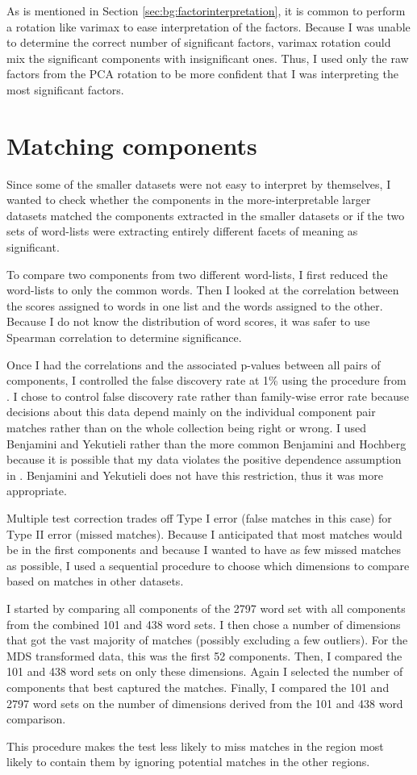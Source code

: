 As is mentioned in Section \ref{sec:bg:factorinterpretation}, it is common to
perform a rotation like varimax to ease interpretation of the factors. Because
I was unable to determine the correct number of significant factors, varimax
rotation could mix the significant components with insignificant ones. Thus, I
used only the raw factors from the PCA rotation to be more confident that I was
interpreting the most significant factors.

\section{Matching components}
\label{sec:matchingcomponents}
Since some of the smaller datasets were not easy to interpret by themselves, I
wanted to check whether the components in the more-interpretable larger datasets
matched the components extracted in the smaller datasets or if the two sets
of word-lists were extracting entirely different facets of meaning as
significant.

To compare two components from two different word-lists, I first reduced the
word-lists to only the common words. Then I looked at the correlation between
the scores assigned to words in one list and the words assigned to the other.
Because I do not know the distribution of word scores, it was safer to use
Spearman correlation to determine significance.

Once I had the correlations and the associated p-values between all pairs of
components, I controlled the false discovery rate at 1\% using the procedure
from \citep{Benjamini2001}. I chose to control false discovery 
rate rather than
family-wise error rate because decisions about this data depend mainly on the
individual component pair matches rather than on the whole collection being 
right or wrong. I used Benjamini and Yekutieli rather than the more common
Benjamini and Hochberg because it is possible that my data violates the 
positive dependence assumption in 
\citep{Benjamini1995}. Benjamini and Yekutieli does not have this restriction, thus it was
more appropriate.

Multiple test correction trades off Type I error (false matches in this case) 
for Type II error (missed matches). Because I anticipated that most matches
would be in the first components and because I wanted to have as few missed
matches as possible, I used a sequential procedure to choose which dimensions
to compare based on matches in other datasets.

I started by comparing all components of the 2797 word set with all 
components from the combined 101 and 438 word sets. I then chose a number of
dimensions that got the vast majority of matches (possibly excluding a few
outliers). For the MDS transformed data, this was the first 52 components. 
Then, I compared the 101 and 438 word sets on only these dimensions. Again I
selected the number of components that best captured the matches. Finally,
I compared the 101 and 2797 word sets on the number of dimensions derived from
the 101 and 438 word comparison. 

This procedure makes the test less likely to miss matches in the region most
likely to contain them by ignoring potential matches in the other regions.
